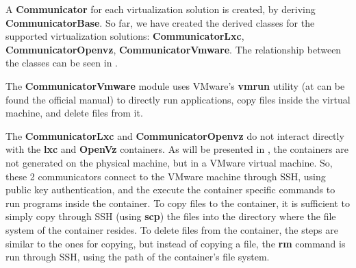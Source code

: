 A \textbf{Communicator} for each virtualization solution is created, by
deriving \textbf{CommunicatorBase}. So far, we have created the derived classes
for the supported virtualization solutions: \textbf{CommunicatorLxc},
\textbf{CommunicatorOpenvz}, \textbf{CommunicatorVmware}. The relationship
between the classes can be seen in .


The \textbf{CommunicatorVmware} module uses VMware's \textbf{vmrun} utility (at
\cite{vmrun-man} can be found the official manual) to directly run
applications, copy files inside the virtual machine, and delete files from it.

The \textbf{CommunicatorLxc} and \textbf{CommunicatorOpenvz} do not interact
directly with the \textbf{lxc} and \textbf{OpenVz} containers. As will be
presented in , the containers are not
generated on the physical machine, but in a VMware virtual machine. So, these 2
communicators connect to the VMware machine through SSH, using public key
authentication, and the execute the container specific commands to run programs
inside the container. To copy files to the container, it is sufficient to
simply copy through SSH (using \textbf{scp}) the files into the directory where
the file system of the container resides. To delete files from the container,
the steps are similar to the ones for copying, but instead of copying a file,
the \textbf{rm} command is run through SSH, using the path of the container's
file system.
